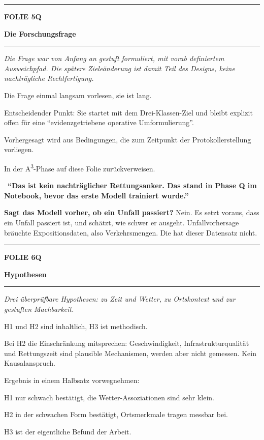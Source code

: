 \documentclass[9pt]{extarticle}
\newcommand{\karte}[3]{%
  \clearpage
  {\color{Accent}\rule{\linewidth}{2.4pt}}\par\vspace{2.5pt}
  {\fontsize{8}{9}\selectfont\bfseries\color{Accent}%
   FOLIE #1\hspace{1.2em}\textbar\hspace{1.2em}#2}\par\vspace{1pt}
  {\fontsize{16}{18}\selectfont\bfseries\color{AccentDark}#3}\par\vspace{3pt}
  {\color{Accent!45}\rule{\linewidth}{0.5pt}}\par\vspace{4pt}%
}
\newcommand{\rubrik}[1]{%
  \vspace{3.5pt}{\fontsize{7.5}{8.5}\selectfont\bfseries\color{Grau}%
  \MakeUppercase{#1}}\par\vspace{1.5pt}}
\newcommand{\kernsatz}[1]{%
  \begin{tcolorbox}[enhanced,sharp corners,boxrule=0pt,
    leftrule=2.2pt,colframe=Accent,colback=AccentPale,
    left=5pt,right=5pt,top=3.5pt,bottom=3.5pt,before skip=1pt,after skip=2pt]
    \color{AccentDark}\itshape #1
  \end{tcolorbox}}
\newcommand{\merksatz}[1]{%
  \vspace{2pt}{\color{KSI}$\blacktriangleright$}\ \textbf{\color{KSI}#1}\par}
\newcommand{\frage}[2]{\item \textbf{\color{AccentDark}#1} #2}
\begin{document}
\karte{5}{Q}{Die Forschungsfrage}

\kernsatz{Die Frage war von Anfang an gestuft formuliert, mit vorab definiertem Ausweichpfad.
Die spätere Zieleänderung ist damit Teil des Designs, keine nachträgliche Rechtfertigung.}

\rubrik{Sagen}
\begin{sag}
  \item Die Frage einmal langsam vorlesen, sie ist lang.
  \item Entscheidender Punkt: Sie startet mit dem Drei-Klassen-Ziel und bleibt explizit offen
        für eine \enquote{evidenzgetriebene operative Umformulierung}.
  \item Vorhergesagt wird aus Bedingungen, die zum Zeitpunkt der Protokollerstellung vorliegen.
  \item In der A\textsuperscript{3}-Phase auf diese Folie zurückverweisen.
\end{sag}

\merksatz{\enquote{Das ist kein nachträglicher Rettungsanker. Das stand in Phase Q im Notebook,
bevor das erste Modell trainiert wurde.}}

\rubrik{Wenn gefragt}
\begin{begriff}
  \frage{Sagt das Modell vorher, ob ein Unfall passiert?}{Nein. Es setzt voraus, dass ein Unfall
    passiert ist, und schätzt, wie schwer er ausgeht. Unfallvorhersage bräuchte Expositionsdaten,
    also Verkehrsmengen. Die hat dieser Datensatz nicht.}
\end{begriff}

\karte{6}{Q}{Hypothesen}

\kernsatz{Drei überprüfbare Hypothesen: zu Zeit und Wetter, zu Ortskontext und zur
gestuften Machbarkeit.}

\rubrik{Sagen}
\begin{sag}
  \item H1 und H2 sind inhaltlich, H3 ist methodisch.
  \item Bei H2 die Einschränkung mitsprechen: Geschwindigkeit, Infrastrukturqualität und
        Rettungszeit sind plausible Mechanismen, werden aber nicht gemessen. Kein Kausalanspruch.
  \item Ergebnis in einem Halbsatz vorwegnehmen:
  \begin{sag}
    \item H1 nur schwach bestätigt, die Wetter-Assoziationen sind sehr klein.
    \item H2 in der schwachen Form bestätigt, Ortsmerkmale tragen messbar bei.
    \item H3 ist der eigentliche Befund der Arbeit.
  \end{sag}
\end{sag}
\end{document}
